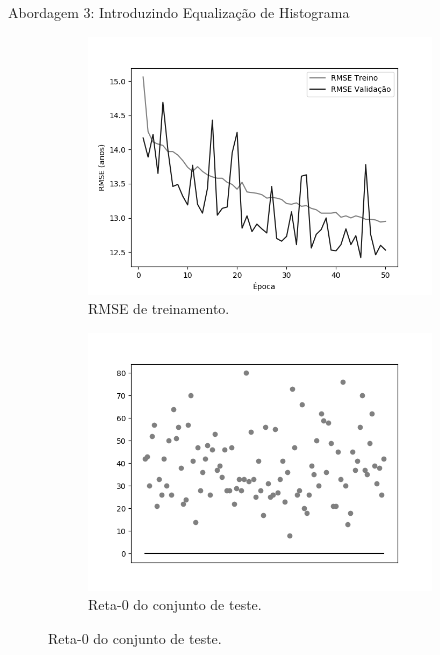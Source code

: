 \begin{frame}{Abordagem 3: Introduzindo Equalização de Histograma}
\begin{figure}[h!]
  \caption{Resultados do treinamento e teste da CNN LeNet \emph{ReLU}.}
  \begin{subfigure}[hb]{0.4\textwidth}
    \caption{RMSE de treinamento.}
    \includegraphics[width=\linewidth]{img/graficos/history/lenet/fig-history-image-treat-3-lenet-relu-rmse.png}%
  \end{subfigure}%
  \begin{subfigure}[hb]{0.4\textwidth}
    \caption{Reta-0 do conjunto de teste.}
    \includegraphics[width=\linewidth]{img/graficos/reta0/lenet/fig-reta-0-image-treat-3-lenet-relu.png}%
  \end{subfigure}
\end{figure}
\end{frame}

